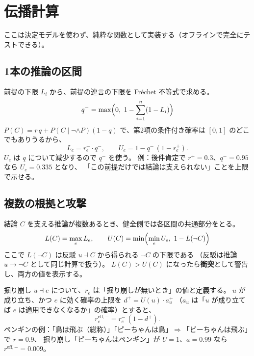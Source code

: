 \documentclass[a4paper,11pt]{ltjsarticle}
\begin{document}
\section{伝播計算}

ここは決定モデルを使わず、純粋な関数として実装する（オフラインで完全にテストできる）。

\subsection{1本の推論の区間}

前提の下限 $L_i$ から、前提の連言の下限を Fréchet 不等式で求める。
\begin{equation}
  q^- = \max\Bigl(0,\ 1 - \sum_{i=1}^n (1 - L_i)\Bigr)
\end{equation}
$P(C) = r\,q + P(C\mid\neg\wedge P)(1-q)$ で、第2項の条件付き確率は $[0,1]$ のどこでもありうるから、
\begin{equation}
  L_e = r_e^- \cdot q^-, \qquad U_e = 1 - q^-\,(1 - r_e^+).
\end{equation}
$U_e$ は $q$ について減少するので $q^-$ を使う。
例：後件肯定で $r^+=0.3$、$q^-=0.95$ なら $U_e = 0.335$ となり、
「この前提だけでは結論は支えられない」ことを上限で示せる。

\subsection{複数の根拠と攻撃}\label{sec:attack}

結論 $C$ を支える推論が複数あるとき、健全側では各区間の共通部分をとる。
\begin{equation}
  L(C) = \max_e L_e,\qquad U(C) = \min\Bigl(\min_e U_e,\ 1 - L(\neg C)\Bigr)
\end{equation}
ここで $L(\neg C)$ は反駁 $u \dashv C$ から得られる $\neg C$ の下限である
（反駁は推論 $u \to \neg C$ として同じ計算で扱う）。
$L(C) > U(C)$ になったら\textbf{衝突}として警告し、両方の値を表示する。

掘り崩し $u \dashv e$ について、$r_e$ は「掘り崩しが無いとき」の値と定義する。
$u$ が成り立ち、かつ $e$ に効く確率の上限を $d^+ = U(u)\cdot a_u^+$
（$a_u$ は「$u$ が成り立てば $e$ は適用できなくなるか」の確率）とすると、
\begin{equation}
  r_e^{\text{eff},-} = r_e^- \,(1 - d^+).
\end{equation}
ペンギンの例：「鳥は飛ぶ（総称）」「ピーちゃんは鳥」$\Rightarrow$「ピーちゃんは飛ぶ」で $r=0.9$、
掘り崩し「ピーちゃんはペンギン」が $U=1$、$a=0.99$ なら $r^{\text{eff},-}=0.009$。
\end{document}
